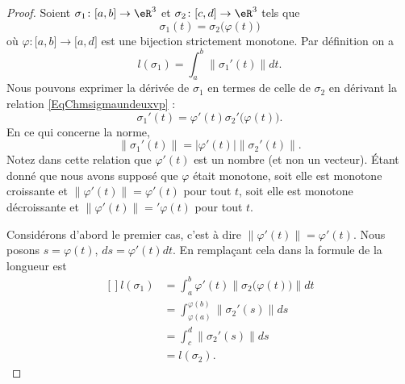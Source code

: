 \begin{proof}
    Soient $\sigma_1\colon \mathopen[ a , b \mathclose]\to \eR^3$ et $\sigma_2\colon \mathopen[ c , d \mathclose]\to \eR^3$ tels que
    \begin{equation}     \label{EqChmsigmaundeuxvp}
        \sigma_1(t)=\sigma_2\big( \varphi(t) \big)
    \end{equation}
    où $\varphi\colon \mathopen[ a , b \mathclose]\to \mathopen[ a , d \mathclose]$ est une bijection strictement monotone. Par définition on a
    \begin{equation}
        l(\sigma_1)=\int_a^b\| \sigma_1'(t) \|dt.
    \end{equation}
    Nous pouvons exprimer la dérivée de $\sigma_1$ en termes de celle de $\sigma_2$ en dérivant la relation \eqref{EqChmsigmaundeuxvp} :
    \begin{equation}
        \sigma_1'(t)=\varphi'(t)\sigma_2'\big( \varphi(t) \big).
    \end{equation}
    En ce qui concerne la norme,
    \begin{equation}
        \| \sigma_1'(t) \|=| \varphi'(t) |\| \sigma_2'(t) \|.
    \end{equation}
    Notez dans cette relation que $\varphi'(t)$ est un nombre (et non un vecteur). Étant donné que nous avons supposé que $\varphi$ était monotone, soit elle est monotone croissante et $\| \varphi'(t) \|=\varphi'(t)$ pour tout $t$, soit elle est monotone décroissante et $\| \varphi'(t) \|='\varphi(t)$ pour tout $t$.

    Considérons d'abord le premier cas, c'est à dire $\| \varphi'(t) \|=\varphi'(t)$. Nous posons $s=\varphi(t)$, $ds=\varphi'(t)dt$. En remplaçant cela dans la formule de la longueur est
    \begin{equation}
        \begin{aligned}[]
            l(\sigma_1)&=\int_a^b\varphi'(t)\| \sigma_2\big( \varphi(t) \big) \|dt\\
            &=\int_{\varphi(a)}^{\varphi(b)}\| \sigma_2'(s) \|ds\\
            &=\int_c^d\| \sigma_2'(s) \|ds\\
            &=l(\sigma_2).
        \end{aligned}
    \end{equation}
    

\end{proof}
